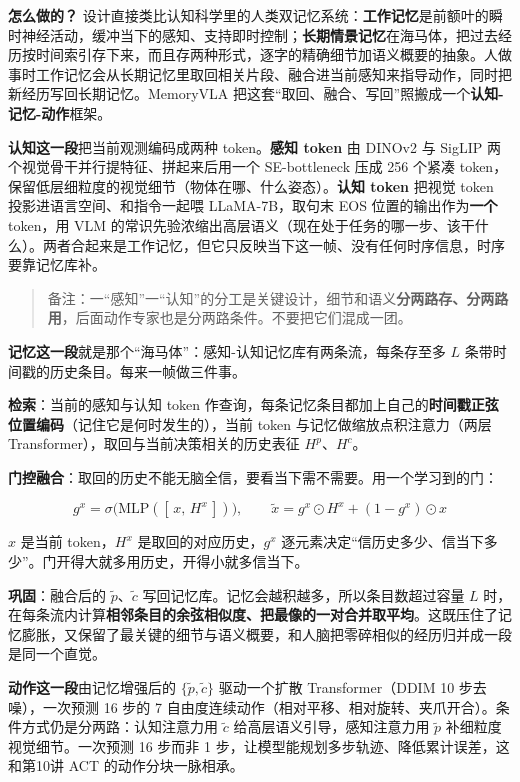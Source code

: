 \documentclass[
  chinese,
]{ctexart}
\begin{document}
\textbf{怎么做的？}
设计直接类比认知科学里的人类双记忆系统：\textbf{工作记忆}是前额叶的瞬时神经活动，缓冲当下的感知、支持即时控制；\textbf{长期情景记忆}在海马体，把过去经历按时间索引存下来，而且存两种形式，逐字的精确细节加语义概要的抽象。人做事时工作记忆会从长期记忆里取回相关片段、融合进当前感知来指导动作，同时把新经历写回长期记忆。MemoryVLA
把这套``取回、融合、写回''照搬成一个\textbf{认知-记忆-动作}框架。

\textbf{认知这一段}把当前观测编码成两种 token。\textbf{感知 token} 由
DINOv2 与 SigLIP 两个视觉骨干并行提特征、拼起来后用一个 SE-bottleneck
压成 256 个紧凑
token，保留低层细粒度的视觉细节（物体在哪、什么姿态）。\textbf{认知
token} 把视觉 token 投影进语言空间、和指令一起喂 LLaMA-7B，取句末 EOS
位置的输出作为\textbf{一个} token，用 VLM
的常识先验浓缩出高层语义（现在处于任务的哪一步、该干什么）。两者合起来是工作记忆，但它只反映当下这一帧、没有任何时序信息，时序要靠记忆库补。

\begin{quote}
备注：一``感知''一``认知''的分工是关键设计，细节和语义\textbf{分两路存、分两路用}，后面动作专家也是分两路条件。不要把它们混成一团。
\end{quote}

\textbf{记忆这一段}就是那个``海马体''：感知-认知记忆库有两条流，每条存至多
\(L\) 条带时间戳的历史条目。每来一帧做三件事。

\textbf{检索}：当前的感知与认知 token
作查询，每条记忆条目都加上自己的\textbf{时间戳正弦位置编码}（记住它是何时发生的），当前
token 与记忆做缩放点积注意力（两层
Transformer），取回与当前决策相关的历史表征 \(H^p\)、\(H^c\)。

\textbf{门控融合}：取回的历史不能无脑全信，要看当下需不需要。用一个学习到的门：

\[g^x = \sigma\bigl(\mathrm{MLP}([\,x,\,H^x\,])\bigr), \qquad \tilde x = g^x \odot H^x + (1-g^x)\odot x\]

\(x\) 是当前 token，\(H^x\) 是取回的对应历史，\(g^x\)
逐元素决定``信历史多少、信当下多少''。门开得大就多用历史，开得小就多信当下。

\textbf{巩固}：融合后的 \(\tilde p\)、\(\tilde c\)
写回记忆库。记忆会越积越多，所以条目数超过容量 \(L\)
时，在每条流内计算\textbf{相邻条目的余弦相似度、把最像的一对合并取平均}。这既压住了记忆膨胀，又保留了最关键的细节与语义概要，和人脑把零碎相似的经历归并成一段是同一个直觉。

\textbf{动作这一段}由记忆增强后的 \(\{\tilde p, \tilde c\}\)
驱动一个扩散 Transformer（DDIM 10 步去噪），一次预测 16 步的 7
自由度连续动作（相对平移、相对旋转、夹爪开合）。条件方式仍是分两路：认知注意力用
\(\tilde c\) 给高层语义引导，感知注意力用 \(\tilde p\)
补细粒度视觉细节。一次预测 16 步而非 1
步，让模型能规划多步轨迹、降低累计误差，这和第10讲 ACT
的动作分块一脉相承。
\end{document}
